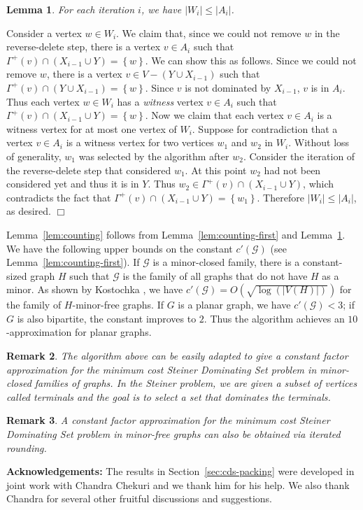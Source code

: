 \documentclass[11pt]{article}
\newtheorem{lemma}{Lemma}[section]
\newtheorem{remark}[lemma]{Remark}
\renewenvironment{proof}{\vspace{-0.1in}\noindent{\bf Proof:}}{\hspace*{\fill}$\Box$\par}
\def\script#1{\mathcal{#1}}
\def\card#1{\left|#1\right|}
\def\set#1{\left\{#1\right\}}
\def\sG{\script{G}}
\def\mypar#1{{\medskip\noindent \textbf{#1}}}
\def\prob#1{\textsf{\textup{#1}}\xspace}
\begin{document}
\begin{lemma} \label{lem:counting-second}
	For each iteration $i$, we have $\card{W_i} \leq \card{A_i}$.
\end{lemma}
\begin{proof}
	Consider a vertex $w \in W_i$. We claim that, since we could not
	remove $w$ in the reverse-delete step, there is a vertex $v \in
	A_i$ such that $\Gamma^+(v) \cap (X_{i - 1} \cup Y) = \set{w}$.
	We can show this as follows. Since we could not remove $w$, there
	is a vertex $v \in V - (Y \cup X_{i - 1})$ such that $\Gamma^+(v)
	\cap (Y \cup X_{i - 1}) = \set{w}$. Since $v$ is not dominated by
	$X_{i - 1}$, $v$ is in $A_i$. Thus each vertex $w \in W_i$ has a
	\emph{witness} vertex $v \in A_i$ such that $\Gamma^+(v) \cap
	(X_{i - 1} \cup Y) = \set{w}$. Now we claim that each vertex $v
	\in A_i$ is a witness vertex for at most one vertex of $W_i$.
	Suppose for contradiction that a vertex $v \in A_i$ is a witness
	vertex for two vertices $w_1$ and $w_2$ in $W_i$. Without loss of
	generality, $w_1$ was selected by the algorithm after $w_2$.
	Consider the iteration of the reverse-delete step that considered
	$w_1$. At this point $w_2$ had not been considered yet and thus
	it is in $Y$. Thus $w_2 \in \Gamma^+(v) \cap (X_{i - 1} \cup Y)$,
	which contradicts the fact that $\Gamma^+(v) \cap (X_{i - 1} \cup
	Y) = \set{w_1}$. Therefore $\card{W_i} \leq \card{A_i}$, as
	desired.
\end{proof}

\medskip\noindent
Lemma~\ref{lem:counting} follows from Lemma~\ref{lem:counting-first}
and Lemma~\ref{lem:counting-second}. We have the following upper
bounds on the constant $c'(\sG)$ (see
Lemma~\ref{lem:counting-first}). If $\sG$ is a minor-closed family,
there is a constant-sized graph $H$ such that $\sG$ is the family of
all graphs that do not have $H$ as a minor. As shown by Kostochka
\cite{Kostochka84}, we have $c'(\sG) = O(\sqrt{\log(\card{V(H)})})$ for
the family of $H$-minor-free graphs. If $G$ is a planar graph, we
have $c'(\sG) < 3$; if $G$ is also bipartite, the constant improves
to $2$. Thus the algorithm achieves an $10$-approximation for planar
graphs.

\begin{remark}
	The algorithm above can be easily adapted to give a constant
	factor approximation for the minimum cost \prob{Steiner
	Dominating Set} problem in minor-closed families of graphs. In
	the Steiner problem, we are given a subset of vertices called
	terminals and the goal is to select a set that dominates the
	terminals.
\end{remark}

\begin{remark}
	A constant factor approximation for the minimum cost \prob{Steiner
	Dominating Set} problem in minor-free graphs can also be obtained
	via iterated rounding.
\end{remark}

\mypar{Acknowledgements:}
The results in Section~\ref{sec:cds-packing} were developed in joint
work with Chandra Chekuri and we thank him for his help. We also
thank Chandra for several other fruitful discussions and suggestions.
\newpage


\end{document}
